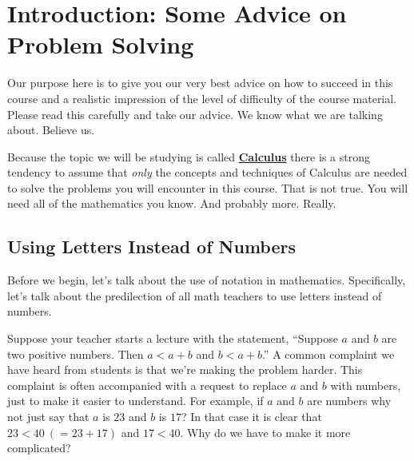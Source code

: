 \chapter{Introduction: Some  Advice on Problem Solving}
\label{cha:problem-solving}
\pagestyle{myheadings}



Our purpose here is to give you our very best advice on how to succeed
in this course and a realistic impression of the level of difficulty
of the course material. Please read this carefully and take our
advice. We know what we are talking about. Believe us.

Because the topic we will be studying is called
\underline{\bf{}Calculus} there is a strong tendency to assume that
\emph{only} the concepts and techniques of Calculus are needed to
solve the problems you will encounter in this course. That is not
true. You will need all of the mathematics you know. And probably
more. Really.


 \section{Using Letters Instead of Numbers}
 \label{sec:using-lett-inst}

  Before we begin, let's talk about the use  of notation in
  mathematics. Specifically, let's talk about the predilection of all
  math teachers to use letters instead of numbers.

  Suppose your teacher starts a lecture with the statement, ``Suppose
  $a$ and $b$ are two positive numbers. Then $a \lt{} a+b$ and $b \lt{} a+b$.'' A
  common complaint we have heard from students is that we're making
  the problem harder. This complaint is often accompanied with a
  request to replace $a$ and $b$ with numbers, just to make it easier
  to understand. For example, if $a$ and $b$ are numbers why not
  just say that $a$ is $23$ and $b$ is $17$? In that case it is clear
  that $23 \lt{} 40\ (=23+17)$ and $17 \lt{} 40$. Why do we have to make
  it more complicated?

